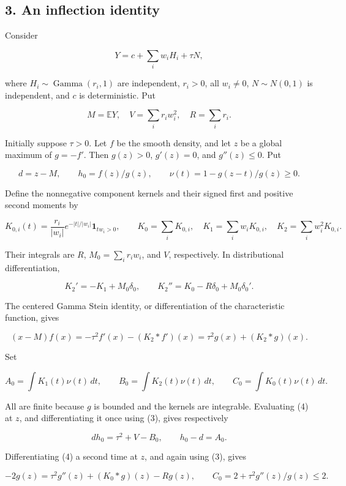 \documentclass[10pt,a4paper]{article}
\begin{document}
\subsection{3. An inflection identity}\label{an-inflection-identity}

Consider

\[
Y=c+\sum_i w_i H_i+\tau N,
\]

where \(H_i\sim\operatorname{Gamma}(r_i,1)\) are independent, \(r_i>0\),
all \(w_i\ne0\), \(N\sim N(0,1)\) is independent, and \(c\) is
deterministic. Put

\[
M=\mathbb EY,\quad V=\sum_i r_iw_i^2,\quad R=\sum_i r_i.
\]

Initially suppose \(\tau>0\). Let \(f\) be the smooth density, and let
\(z\) be a global maximum of \(g=-f'\). Then \(g(z)>0\), \(g'(z)=0\),
and \(g''(z)\le0\). Put

\[
d=z-M,\qquad h_0=f(z)/g(z),\qquad
\nu(t)=1-g(z-t)/g(z)\ge0.
\]

Define the nonnegative component kernels and their signed first and
positive second moments by

\[
K_{0,i}(t)=\frac{r_i}{|w_i|}e^{-|t|/|w_i|}\mathbf1_{tw_i>0},
\qquad K_0=\sum_iK_{0,i},
\quad K_1=\sum_iw_iK_{0,i},
\quad K_2=\sum_iw_i^2K_{0,i}.
\]

Their integrals are \(R\), \(M_0=\sum_i r_iw_i\), and \(V\),
respectively. In distributional differentiation,

\[
K_2'=-K_1+M_0\delta_0,
\qquad K_2''=K_0-R\delta_0+M_0\delta_0'.             \tag{3}
\]

The centered Gamma Stein identity, or differentiation of the
characteristic function, gives

\[
(x-M)f(x)=-\tau^2f'(x)-(K_2*f')(x)
=\tau^2g(x)+(K_2*g)(x).                            \tag{4}
\]

Set

\[
A_0=\int K_1(t)\nu(t)\,dt,
\qquad B_0=\int K_2(t)\nu(t)\,dt,
\qquad C_0=\int K_0(t)\nu(t)\,dt.
\]

All are finite because \(g\) is bounded and the kernels are integrable.
Evaluating (4) at \(z\), and differentiating it once using (3), gives
respectively

\[
dh_0=\tau^2+V-B_0,
\qquad h_0-d=A_0.
\]

Differentiating (4) a second time at \(z\), and again using (3), gives

\[
-2g(z)=\tau^2g''(z)+(K_0*g)(z)-Rg(z),
\qquad C_0=2+\tau^2g''(z)/g(z)\le2.                \tag{5}
\]
\end{document}
